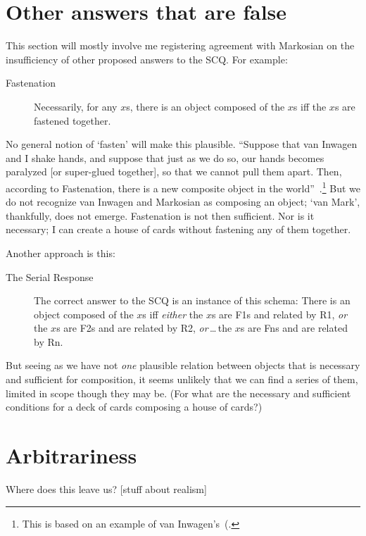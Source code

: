 \documentclass[11pt]{article}
\begin{document}
\begin{spacing}{1.5}
\section{Other answers that are false}
This section will mostly involve me registering agreement with
Markosian on the insufficiency of other proposed answers to the
SCQ. For example:
\begin{description}
	\item[Fastenation] Necessarily, for any $x$s, there is an
          object composed of the $x$s iff the $x$s are fastened
          together.~\citep[223]{markosian1998a}
\end{description}
No general notion of `fasten' will make this plausible. ``Suppose that
van Inwagen and I shake hands, and suppose that just as we do so, our
hands becomes paralyzed [or super-glued together], so that we cannot
pull them apart. Then, according to Fastenation, there is a new
composite object in the
world''~\citep[224]{markosian1998a}.\footnote{This is based on an
  example of van Inwagen's~(\citeyear[57--58]{inwagen1995}.} But we do
not recognize van Inwagen and Markosian as composing an object; `van
Mark', thankfully, does not emerge. Fastenation is not then
sufficient. Nor is it necessary; I can create a house of cards without
fastening any of them together.

Another approach is this:
\begin{description}
	\item[The Serial Response] The correct answer to the SCQ is an
          instance of this schema: There is an object composed of the
          $x$s iff {\em either} the $x$s are F1s and related by R1,
          {\em or} the $x$s are F2s and are related by R2, {\em
            or}\,\ldots\,the $x$s are Fns and are related by
          Rn.~\citep[230]{markosian1998a}
\end{description}
But seeing as we have not {\em one} plausible relation between objects
that is necessary and sufficient for composition, it seems unlikely
that we can find a series of them, limited in scope though they may
be. (For what are the necessary and sufficient conditions for a deck
of cards composing a house of cards?)

\section{Arbitrariness}
Where does this leave us? [stuff about realism]

\ifstandalone
\end{spacing}%
\fi
\end{document}
